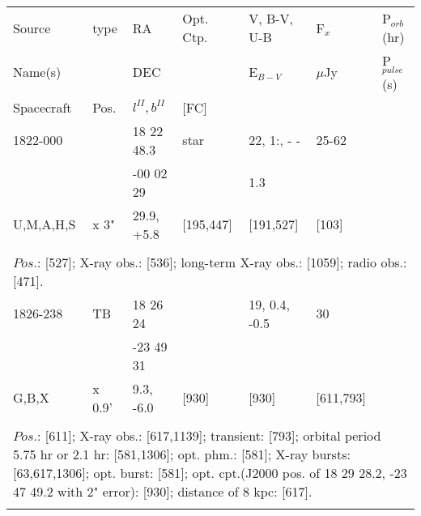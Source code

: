 \documentclass{aa}
\begin{document}
\begin{tabular}{p{2.5cm}p{1cm}p{1.8cm}p{2.3cm}p{3.3cm}p{2.0cm}p{2.2cm}}
\noalign{\smallskip}
\multicolumn{7}{p{17.5cm}}{Table 1.  (continued) }\\        
\hline
\noalign{\smallskip}
Source         & type  & RA                       &  Opt. Ctp. & V, B-V, U-B  & F$_{x}$          & P$_{orb}$(hr)    \\
Name(s)       &            & DEC                    &                     & E$_{B-V}$   & $\mu$Jy        & P$_{pulse}$(s) \\
Spacecraft & Pos.  & $l^{II}, b^{II}$      &  [FC]           &                        &                         &                             \\
\noalign{\smallskip} 
\hline

\noalign{\smallskip}
1822-000         &                    & 18 22 48.3              & star                     & 22, 1:, - -             & 25-62              &       \\
                          &                    & -00 02 29                &                              & 1.3                       &                         &      \\
U,M,A,H,S       & x 3"            & 29.9, +5.8               & [195,447]            & [191,527]           & [103]                  &       \\
\\
\multicolumn{7}{p{17.5cm}}{
$Pos$.: [527]; X-ray obs.: [536]; long-term X-ray obs.: [1059]; radio obs.: [471].}\\
\noalign{\smallskip}
\hline

\noalign{\smallskip}
1826-238             & TB               & 18 26 24               &                              & 19, 0.4, -0.5        & 30                  &              \\
                              &                      & -23 49 31             &                              &                              &                       &                 \\
G,B,X                   & x 0.9'           & 9.3, -6.0                &  [930]                   & [930]                    & [611,793]     &            \\
\\
\multicolumn{7}{p{17.5cm}}{
$Pos$.: [611]; X-ray obs.: [617,1139]; transient: [793]; orbital period 5.75 hr or 2.1 hr: [581,1306]; opt. phm.: [581]; 
X-ray bursts: [63,617,1306]; opt. burst: [581]; opt. cpt.(J2000 pos. of 18 29 28.2, -23 47 49.2 with 2" error): [930]; 
distance of 8 kpc: [617].}\\
\noalign{\smallskip}
\hline


\end{tabular}
\end{document}
